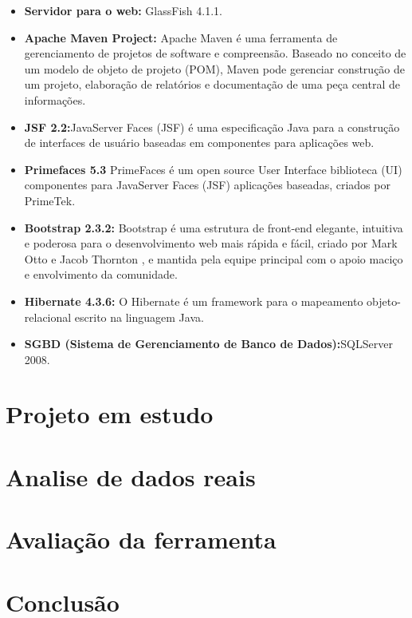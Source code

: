 \documentclass{acm_proc_article-sp}
\begin{document}
\begin{itemize}
\item \textbf{Servidor para o web:} GlassFish 4.1.1. 
\item \textbf{Apache Maven Project:} Apache Maven é uma ferramenta de gerenciamento de projetos de software e compreensão. Baseado no conceito de um modelo de objeto de projeto (POM), Maven pode gerenciar construção de um projeto, elaboração de relatórios e documentação de uma peça central de informações.
\item \textbf{JSF 2.2:}JavaServer Faces (JSF) é uma especificação Java para a construção de interfaces de usuário baseadas em componentes para aplicações web.
\item \textbf{Primefaces 5.3} PrimeFaces é um open source User Interface biblioteca (UI) componentes para JavaServer Faces (JSF) aplicações baseadas, criados por PrimeTek.  
\item \textbf{Bootstrap 2.3.2:} Bootstrap é uma estrutura de front-end elegante, intuitiva e poderosa para o desenvolvimento web mais rápida e fácil, criado por Mark Otto e Jacob Thornton , e mantida pela equipe principal com o apoio maciço e envolvimento da comunidade. 
\item \textbf{Hibernate 4.3.6:} O Hibernate é um framework para o mapeamento objeto-relacional escrito na linguagem Java. 
\item \textbf{SGBD (Sistema de Gerenciamento de Banco de Dados):}SQLServer 2008. 
\end{itemize}


\section{Projeto em estudo}

\section{Analise de dados reais}

\section{Avaliação da ferramenta}

\section{Conclusão}


\end{document}
